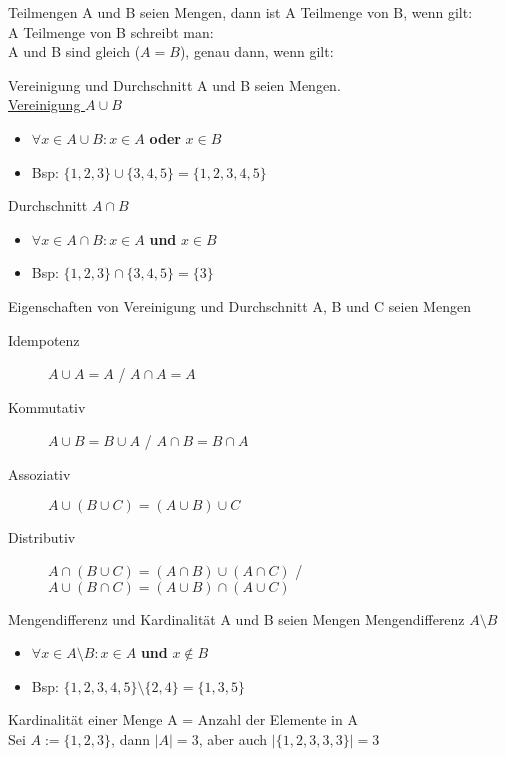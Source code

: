 \begin{frame}{Teilmengen}
	A und B seien Mengen, dann ist A Teilmenge von B, wenn gilt:
	\\
	A Teilmenge von B schreibt man:
	\\
	A und B sind gleich ($A = B$), genau dann, wenn gilt:
\end{frame}

\begin{frame}{Vereinigung und Durchschnitt}
	A und B seien Mengen.\\
	\underline{Vereinigung $A\cup B$}
	\begin{itemize}
		\item $\forall x\in A\cup B: x\in A$ \textbf{oder} $x\in B$
		\item Bsp: $\{1, 2, 3\}\cup \{3, 4, 5\} = \{1, 2, 3, 4, 5\}$
	\end{itemize}
	Durchschnitt $A\cap B$
	\begin{itemize}
		\item $\forall x\in A\cap B: x\in A$ \textbf{und} $x\in B$
		\item Bsp: $\{1, 2, 3\}\cap \{3, 4, 5\} = \{3\}$
	\end{itemize}
\end{frame}

\begin{frame}{Eigenschaften von Vereinigung und Durchschnitt}
	A, B und C seien Mengen
	\begin{description}
		\item[Idempotenz] $A\cup A = A$ / $A\cap A = A$
		\item[Kommutativ] $A\cup B = B\cup A$ / $A\cap B = B\cap A$
		\item[Assoziativ] $A\cup (B\cup C) = (A\cup B) \cup C$
		\item[Distributiv] $A\cap (B\cup C) = (A\cap B)\cup (A\cap C)$ / $A\cup (B\cap C) = (A\cup B)\cap (A\cup C)$
	\end{description}
\end{frame}

\begin{frame}{Mengendifferenz und Kardinalität}
	A und B seien Mengen
	Mengendifferenz $A\setminus B$
	\begin{itemize}
		\item $\forall x\in A\setminus B: x\in A$ \textbf{und} $x\notin B$
		\item Bsp: $\{1, 2, 3, 4, 5\} \setminus \{2, 4\} = \{1, 3, 5\}$
	\end{itemize}
	Kardinalität einer Menge A = Anzahl der Elemente in A\\
	Sei $A := \{1, 2, 3\}$, dann $\lvert A\rvert = 3$, aber auch $\lvert \{1, 2, 3, 3, 3\}\rvert = 3$
\end{frame}


